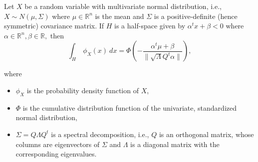 \documentclass[10pt,a4paper]{amsart}
\newcommand{\reals}{\mathbb{R}}
\begin{document}
\begin{thm}\label{maintheorem}
Let $X$ be a random variable with multivariate normal distribution, i.e., $X \sim N(\mu, \Sigma)$ where $\mu\in\reals^n$ is the mean and $\Sigma$ is a positive-definite (hence symmetric) covariance matrix. If $H$ is a half-space given by $\alpha^t x + \beta < 0$ where $\alpha\in \reals^n, \beta \in \reals,$ then
$$\int_H\ \phi_X(x)\ dx = \Phi\left(-\frac{\alpha^t\mu + \beta}{\|\sqrt{\Lambda}Q^t\alpha\|}\right),$$

\noindent
where 
\begin{itemize}
	\item $\phi_X$ is the probability density function of $X$,
	\item $\Phi$ is the cumulative distribution function of the univariate, standardized normal distribution,
	\item $\Sigma = Q\Lambda Q^t$ is a spectral decomposition, i.e., $Q$ is an orthogonal matrix, whose columns are  eigenvectors of $\Sigma$ and $\Lambda$ is a diagonal matrix with the corresponding eigenvalues. 
\end{itemize}
\end{thm}
\end{document}
